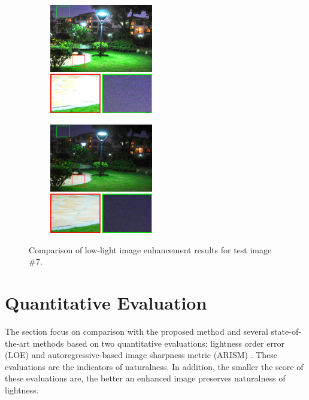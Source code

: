 \begin{figure}[htbp]
\begin{minipage}[b]{0.49\hsize}
		 \label{fig:qualitative/2/rrm}
	\end{minipage} \\
	\begin{minipage}[b]{0.49\hsize}
	\centering
	\includegraphics[width=64mm, height=48mm]{images/experiment/qualitative/comp2/lime.eps}
	 \label{fig:qualitative/2/lime}
	\end{minipage}
	\begin{minipage}[b]{0.49\hsize}
	\centering
	\includegraphics[width=64mm, height=48mm]{images/experiment/qualitative/comp2/prop.eps}
	 \label{fig:qualitative/2/prop}
	\end{minipage}
	\caption{Comparison of low-light image enhancement results for test image $\#7$.}
	\label{fig:qualitative/2}
\end{figure}

\section{Quantitative Evaluation} \label{sec:quantitative}
The section focus on comparison with the proposed method and several state-of-the-art methods based on two quantitative evaluations: lightness order error (LOE) \cite{loe} and autoregressive-based image sharpness metric (ARISM) \cite{arism}. These evaluations are the indicators of naturalness. In addition, the smaller the score of these evaluations are, the better an enhanced image preserves naturalness of lightness.\par
